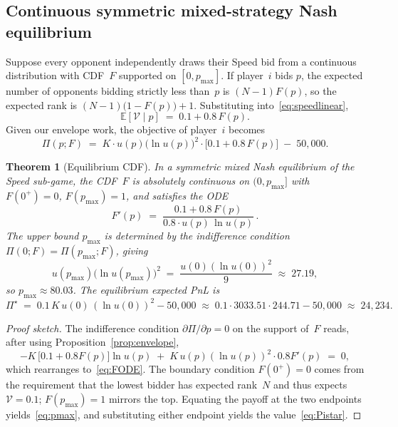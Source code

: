 \documentclass[11pt,a4paper]{article}
\newtheorem{theorem}[proposition]{Theorem}
\theoremstyle{definition}
\theoremstyle{remark}
\newcommand{\Sp}{\mathcal{V}}
\newcommand{\E}{\mathbb{E}}
\begin{document}
\subsection{Continuous symmetric mixed-strategy Nash equilibrium}

Suppose every opponent independently draws their Speed bid from a continuous
distribution with CDF~\(F\) supported on \([0,p_{\max}]\). If player~\(i\) bids
\(p\), the expected number of opponents bidding strictly less than~\(p\) is
\((N-1)F(p)\), so the expected rank is
\((N-1)\bigl(1-F(p)\bigr)+1\). Substituting into~\eqref{eq:speedlinear},
\begin{equation}\label{eq:Vbig}
\E[\Sp\mid p]\;=\;0.1+0.8\,F(p).
\end{equation}
Given our envelope work, the objective of player~\(i\) becomes
\begin{equation}\label{eq:PibigF}
\Pi(p;F)\;=\;K\cdot u(p)\bigl(\ln u(p)\bigr)^2\cdot\bigl[0.1+0.8\,F(p)\bigr]\;-\;50{,}000.
\end{equation}

\begin{theorem}[Equilibrium CDF]\label{thm:mixedNE}
In a symmetric mixed Nash equilibrium of the Speed sub-game, the CDF~\(F\) is
absolutely continuous on \((0,p_{\max}]\) with \(F(0^+)=0\), \(F(p_{\max})=1\),
and satisfies the ODE
\begin{equation}\label{eq:FODE}
F'(p)\;=\;\frac{0.1+0.8\,F(p)}{0.8\cdot u(p)\,\ln u(p)}\,.
\end{equation}
The upper bound \(p_{\max}\) is determined by the indifference condition
\(\Pi(0;F)=\Pi(p_{\max};F)\), giving
\begin{equation}\label{eq:pmax}
u(p_{\max})\bigl(\ln u(p_{\max})\bigr)^2
\;=\;\frac{u(0)(\ln u(0))^2}{9}\;\approx\;27.19,
\end{equation}
so \(p_{\max}\approx 80.03\). The equilibrium expected PnL is
\begin{equation}\label{eq:Pistar}
\Pi^\star\;=\;0.1\,K\,u(0)\,(\ln u(0))^2-50{,}000
\;\approx\;0.1\cdot 3033.51\cdot 244.71-50{,}000\;\approx\;24{,}234.
\end{equation}
\end{theorem}

\begin{proof}[Proof sketch]
The indifference condition
\(\partial\Pi/\partial p=0\) on the support of~\(F\) reads, after using
Proposition~\ref{prop:envelope},
\[
-K\,\bigl[0.1+0.8 F(p)\bigr]\ln u(p)\;+\;K\,u(p)(\ln u(p))^2\cdot 0.8 F'(p)\;=\;0,
\]
which rearranges to~\eqref{eq:FODE}. The boundary condition \(F(0^+)=0\)
comes from the requirement that the lowest bidder has expected rank~\(N\) and thus
expects \(\Sp=0.1\); \(F(p_{\max})=1\) mirrors the top. Equating the payoff at
the two endpoints yields~\eqref{eq:pmax}, and substituting either endpoint
yields the value~\eqref{eq:Pistar}.
\end{proof}
\end{document}
